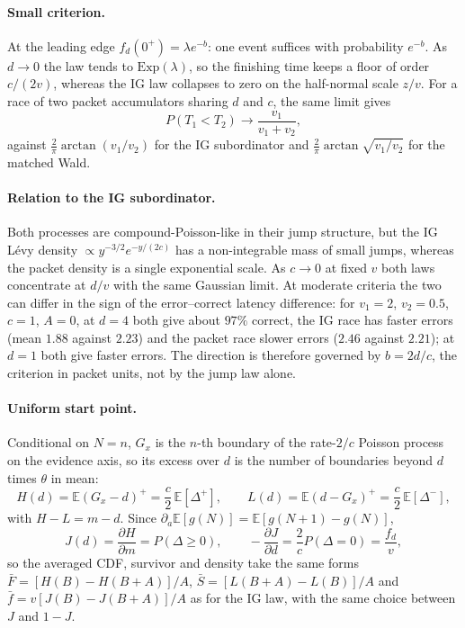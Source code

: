 \documentclass[12pt]{article}
\begin{document}
\paragraph{Small criterion.}
At the leading edge $f_d(0^+)=\lambda e^{-b}$: one event suffices with probability $e^{-b}$. As $d\to0$ the law tends to $\mathrm{Exp}(\lambda)$, so the finishing time keeps a floor of order $c/(2v)$, whereas the IG law collapses to zero on the half-normal scale $z/v$. For a race of two packet accumulators sharing $d$ and $c$, the same limit gives
\begin{equation}
  P(T_1<T_2)\to\frac{v_1}{v_1+v_2},
\end{equation}
against $\frac2\pi\arctan(v_1/v_2)$ for the IG subordinator and $\frac2\pi\arctan\sqrt{v_1/v_2}$ for the matched Wald.

\paragraph{Relation to the IG subordinator.}
Both processes are compound-Poisson-like in their jump structure, but the IG L\'evy density $\propto y^{-3/2}e^{-y/(2c)}$ has a non-integrable mass of small jumps, whereas the packet density is a single exponential scale. As $c\to0$ at fixed $v$ both laws concentrate at $d/v$ with the same Gaussian limit. At moderate criteria the two can differ in the sign of the error--correct latency difference: for $v_1=2$, $v_2=0.5$, $c=1$, $A=0$, at $d=4$ both give
about $97\%$ correct, the IG race has faster errors (mean $1.88$ against $2.23$)
and the packet race slower errors ($2.46$ against $2.21$); at $d=1$ both give faster errors. The direction is therefore governed by $b=2d/c$, the criterion in packet units, not by the jump law alone.

\paragraph{Uniform start point.}
Conditional on $N=n$, $G_x$ is the $n$-th boundary of the rate-$2/c$ Poisson process on the evidence axis, so its excess over $d$ is the number of boundaries beyond $d$ times $\theta$ in mean:
\begin{equation}
  H(d)=\mathbb E(G_x-d)^+=\frac c2\,\mathbb E[\Delta^+],\qquad
  L(d)=\mathbb E(d-G_x)^+=\frac c2\,\mathbb E[\Delta^-],
\end{equation}
with $H-L=m-d$. Since $\partial_a\mathbb E[g(N)]=\mathbb E[g(N+1)-g(N)]$,
\begin{equation}
  J(d)=\frac{\partial H}{\partial m}=P(\Delta\ge0),\qquad
  -\frac{\partial J}{\partial d}=\frac2cP(\Delta=0)=\frac{f_d}{v},
\end{equation}
so the averaged CDF, survivor and density take the same forms $\bar F=[H(B)-H(B+A)]/A$, $\bar S=[L(B+A)-L(B)]/A$ and $\bar f=v[J(B)-J(B+A)]/A$ as for the IG law, with the same choice between $J$ and $1-J$.
\end{document}
